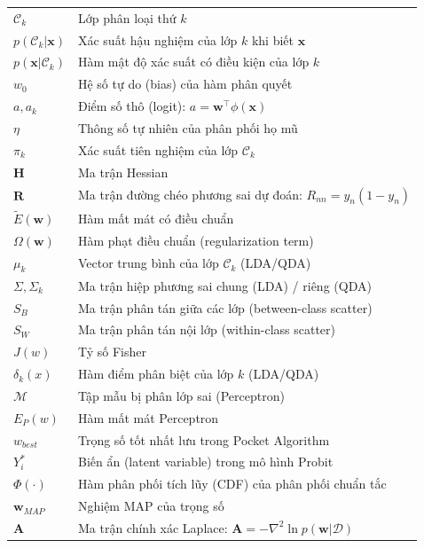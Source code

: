 \documentclass[oneside]{styles/hcmus-report}
\begin{document}
\begin{longtable}{p{} p{}}
$\mathcal{C}_k$         & Lớp phân loại thứ $k$ \\
$p(\mathcal{C}_k|\mathbf{x})$ & Xác suất hậu nghiệm của lớp $k$ khi biết $\mathbf{x}$ \\
$p(\mathbf{x}|\mathcal{C}_k)$ & Hàm mật độ xác suất có điều kiện của lớp $k$ \\
$w_0$                   & Hệ số tự do (bias) của hàm phân quyết \\
$a, a_k$                & Điểm số thô (logit): $a = \mathbf{w}^\top\phi(\mathbf{x})$ \\
$\eta$                  & Thông số tự nhiên của phân phối họ mũ \\
$\pi_k$                 & Xác suất tiên nghiệm của lớp $\mathcal{C}_k$ \\
$\mathbf{H}$            & Ma trận Hessian \\
$\mathbf{R}$            & Ma trận đường chéo phương sai dự đoán: $R_{nn}=y_n(1-y_n)$ \\
$\widetilde{E}(\mathbf{w})$ & Hàm mất mát có điều chuẩn \\
$\Omega(\mathbf{w})$    & Hàm phạt điều chuẩn (regularization term) \\
$\mu_k$                 & Vector trung bình của lớp $\mathcal{C}_k$ (LDA/QDA) \\
$\Sigma, \Sigma_k$      & Ma trận hiệp phương sai chung (LDA) / riêng (QDA) \\
$S_B$                   & Ma trận phân tán giữa các lớp (between-class scatter) \\
$S_W$                   & Ma trận phân tán nội lớp (within-class scatter) \\
$J(w)$                  & Tỷ số Fisher \\
$\delta_k(x)$           & Hàm điểm phân biệt của lớp $k$ (LDA/QDA) \\
$\mathcal{M}$           & Tập mẫu bị phân lớp sai (Perceptron) \\
$E_P(w)$                & Hàm mất mát Perceptron \\
$w_{best}$              & Trọng số tốt nhất lưu trong Pocket Algorithm \\
$Y_i^*$                 & Biến ẩn (latent variable) trong mô hình Probit \\
$\Phi(\cdot)$           & Hàm phân phối tích lũy (CDF) của phân phối chuẩn tắc \\
$\mathbf{w}_{MAP}$      & Nghiệm MAP của trọng số \\
$\mathbf{A}$            & Ma trận chính xác Laplace: $\mathbf{A} = -\nabla^2\ln p(\mathbf{w}|\mathcal{D})$ \\

\end{longtable}
\end{document}
